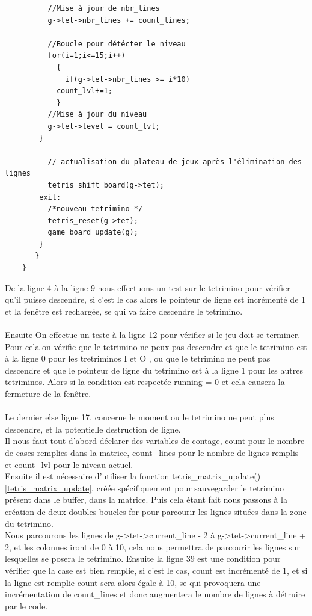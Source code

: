 \documentclass[a4paper,10p]{report}
\begin{document}
\begin{lstlisting}
		  //Mise à jour de nbr_lines
		  g->tet->nbr_lines += count_lines;
		  
		  //Boucle pour détécter le niveau
		  for(i=1;i<=15;i++)
		    {
		      if(g->tet->nbr_lines >= i*10)
			count_lvl+=1;
		    }
		  //Mise à jour du niveau
		  g->tet->level = count_lvl;
		}
	      
	      // actualisation du plateau de jeux après l'élimination des lignes
	      tetris_shift_board(g->tet);
	    exit:
	      /*nouveau tetrimino */
	      tetris_reset(g->tet);
	      game_board_update(g);
	    }
	   }
    }
\end{lstlisting}
De la ligne \textcolor{gris}{4} à la ligne \textcolor{gris}{9} nous effectuons un test sur le tetrimino pour vérifier qu'il puisse descendre, si c'est le cas alors le pointeur de ligne est incrémenté de 1 et la fenêtre est rechargée, se qui va faire descendre le tetrimino.
\\\\
Ensuite On effectue un teste à la ligne \textcolor{gris}{12} pour vérifier si le jeu doit se terminer. Pour cela on vérifie que le tetrimino ne peux pas descendre et que le tetrimino est à la ligne 0 pour les tretriminos I et O , ou que le tetrimino ne peut pas descendre et que le pointeur de ligne du tetrimino est à la ligne 1 pour les autres tetriminos. Alors si la condition est respectée running = 0 et cela causera la fermeture de la fenêtre.
\\\\
Le dernier else ligne \textcolor{gris}{17}, concerne le moment ou le tetrimino ne peut plus descendre, et la potentielle destruction de ligne.
\\Il nous faut tout d'abord déclarer des variables de contage, count pour le nombre de cases remplies dans la matrice, count\_lines pour le nombre de lignes remplis et count\_lvl pour le niveau actuel.
\\Ensuite il est nécessaire d'utiliser la fonction tetris\_matrix\_update() \ref{tetris_matrix_update}, créée spécifiquement pour sauvegarder le tetrimino présent dans le buffer, dans la matrice. Puis cela étant fait nous passons à la création de deux doubles boucles for pour parcourir les lignes situées dans la zone du tetrimino.
\\Nous parcourons les lignes de g->tet->current\_line - 2 à g->tet->current\_line + 2, et les colonnes iront de 0 à 10, cela nous permettra de parcourir les lignes sur lesquelles se posera le tetrimino. Ensuite la ligne \textcolor{gris}{39} est une condition pour vérifier que la case est bien remplie, si c'est le cas, count est incrémenté de 1, et si la ligne est remplie count sera alors égale à 10, se qui provoquera une incrémentation de count\_lines et donc augmentera le nombre de lignes à détruire par le code.
\end{document}

